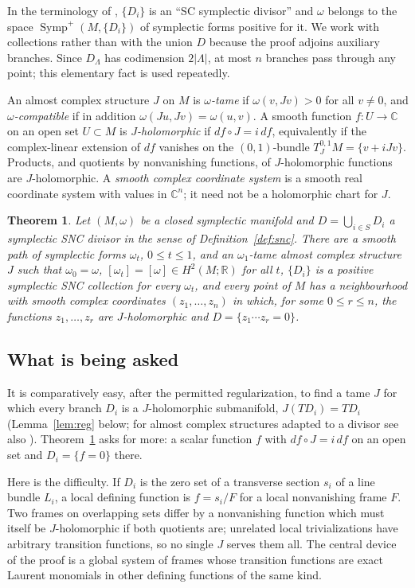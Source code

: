 \documentclass[12pt]{article}
\newtheorem{theorem}{Theorem}
\theoremstyle{remark}
\newcommand{\C}{\mathbb C}
\newcommand{\R}{\mathbb R}
\newcommand{\Symp}{\operatorname{Symp}}
\begin{document}
In the terminology of \cite{FMZ}, $\{D_i\}$ is an ``SC symplectic
divisor'' and $\omega$ belongs to the space $\Symp^+(M,\{D_i\})$ of
symplectic forms positive for it. We work with collections rather than
with the union $D$ because the proof adjoins auxiliary branches. Since
$D_\Lambda$ has codimension $2|\Lambda|$, at most $n$ branches pass
through any point; this elementary fact is used repeatedly.

An almost complex structure $J$ on $M$ is \emph{$\omega$-tame} if
$\omega(v,Jv)>0$ for all $v\neq0$, and \emph{$\omega$-compatible} if in
addition $\omega(Ju,Jv)=\omega(u,v)$. A smooth function $f\colon U\to\C$
on an open set $U\subset M$ is \emph{$J$-holomorphic} if
$df\circ J=i\,df$, equivalently if the complex-linear extension of $df$
vanishes on the $(0,1)$-bundle $T^{0,1}_JM=\{v+iJv\}$. Products, and
quotients by nonvanishing functions, of $J$-holomorphic functions are
$J$-holomorphic. A \emph{smooth complex coordinate system} is a smooth
real coordinate system with values in $\C^n$; it need not be a
holomorphic chart for $J$.

\begin{theorem}\label{thm:main}
Let $(M,\omega)$ be a closed symplectic manifold and $D=\bigcup_{i\in S}D_i$
a symplectic SNC divisor in the sense of Definition~\ref{def:snc}. There
are a smooth path of symplectic forms $\omega_t$, $0\le t\le1$, and an
$\omega_1$-tame almost complex structure $J$ such that $\omega_0=\omega$,
$[\omega_t]=[\omega]\in H^2(M;\R)$ for all $t$, $\{D_i\}$ is a positive
symplectic SNC collection for every $\omega_t$, and every point of $M$
has a neighbourhood with smooth complex coordinates $(z_1,\dots,z_n)$
in which, for some $0\le r\le n$, the functions $z_1,\dots,z_r$ are
$J$-holomorphic and $D=\{z_1\cdots z_r=0\}$.
\end{theorem}

\subsection*{What is being asked}

It is comparatively easy, after the permitted regularization, to find
a tame $J$ for which every branch $D_i$ is a $J$-holomorphic
submanifold, $J(TD_i)=TD_i$ (Lemma~\ref{lem:reg} below; for almost
complex structures adapted to a divisor see also \cite[Section 3]{FZ}).
Theorem~\ref{thm:main} asks for more: a scalar function $f$ with
$df\circ J=i\,df$ on an open set and $D_i=\{f=0\}$ there.

Here is the difficulty. If $D_i$ is the zero set of a transverse
section $s_i$ of a line bundle $L_i$, a local defining function is
$f=s_i/F$ for a local nonvanishing frame $F$. Two frames on
overlapping sets differ by a nonvanishing function which must itself be
$J$-holomorphic if both quotients are; unrelated local trivializations
have arbitrary transition functions, so no single $J$ serves them all.
The central device of the proof is a global system of frames whose
transition functions are exact Laurent monomials in other defining
functions of the same kind.
\end{document}

